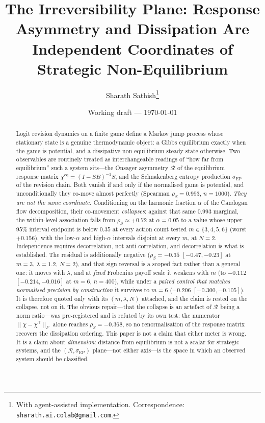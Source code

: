 \documentclass[10pt,a4paper]{article}
\title{\bfseries The Irreversibility Plane: Response Asymmetry and Dissipation
Are Independent Coordinates of Strategic Non-Equilibrium}
\author{Sharath Sathish\thanks{With agent-assisted implementation.
Correspondence: \texttt{sharath.ai.colab@gmail.com}.}}
\date{Working draft --- \today}
\newcommand{\R}{\mathcal{R}}
\newcommand{\EPR}{\sigma_{\mathrm{EP}}}
\newcommand{\chieq}{\chi^{\mathrm{eq}}}
\begin{document}
\maketitle

\begin{abstract}
\noindent
Logit revision dynamics on a finite game define a Markov jump process whose stationary
state is a genuine thermodynamic object: a Gibbs equilibrium exactly when the game is
potential, and a dissipative non-equilibrium steady state otherwise. Two observables are
routinely treated as interchangeable readings of ``how far from equilibrium'' such a system
sits---the Onsager asymmetry $\R$ of the equilibrium response matrix
$\chieq=(I-SB)^{-1}S$, and the Schnakenberg entropy production $\EPR$ of the revision
chain. Both vanish if and only if the normalised game is potential, and unconditionally
they co-move almost perfectly (Spearman $\rho_S=0.993$, $n=1000$). \emph{They are not the
same coordinate.} Conditioning on the harmonic fraction $\alpha$ of the Candogan flow
decomposition, their co-movement \emph{collapses}: against that same $0.993$ marginal, the
within-level association falls from $\rho_S\approx+0.72$ at $\alpha=0.05$ to a value whose
upper $95\%$ interval endpoint is below $0.35$ at every action count tested
$m\in\{3,4,5,6\}$ (worst $+0.156$), with the low-$\alpha$ and high-$\alpha$ intervals
disjoint at every $m$, at $N=2$. Independence requires decorrelation, not anti-correlation,
and decorrelation is what is established. The residual is additionally negative
($\rho_S=-0.35$ $[-0.47,-0.23]$ at $m=3$, $\lambda=1.2$, $N=2$), and that sign reversal is
a scoped fact rather than a general one: it moves with $\lambda$, and at \emph{fixed}
Frobenius payoff scale it weakens with $m$ (to $-0.112$ $[-0.214,-0.016]$ at $m=6$,
$n=400$), while under a \emph{paired control that matches normalised precision by
construction} it survives to $m=6$ ($-0.206$ $[-0.300,-0.105]$). It is therefore quoted only
with its $(m,\lambda,N)$ attached, and the claim is rested on the collapse, not on it. The obvious repair---that the
collapse is an artefact of $\R$ being a norm ratio---was pre-registered and is refuted by
its own test: the numerator $\|\chi-\chi^{\top}\|_F$ alone reaches $\rho_S=-0.368$, so no
renormalisation of the response matrix recovers the dissipation ordering. This paper is
not a claim that either meter is wrong. It is a claim about \emph{dimension}: distance from
equilibrium is not a scalar for strategic systems, and the $(\R,\EPR)$ plane---not either
axis---is the space in which an observed system should be classified.

\end{abstract}
\end{document}
